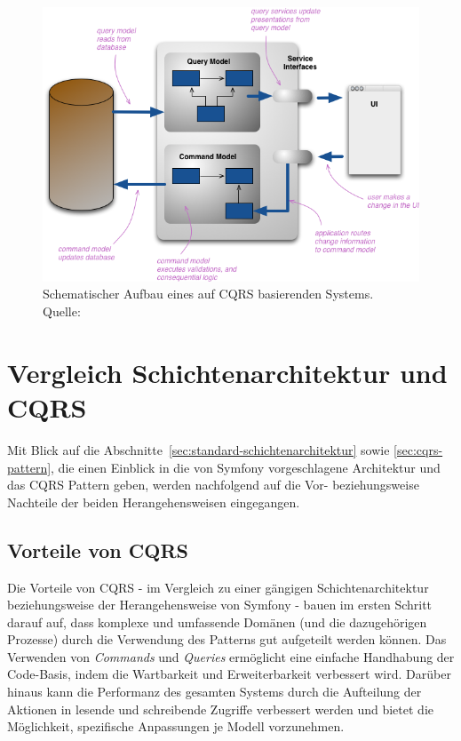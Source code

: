 \documentclass[a4paper,12pt,twoside]{scrreprt}
\begin{document}
\begin{figure}[ht]
    \centering
    \includegraphics[scale=0.6]{images/cqrs_fowler.png}
    \caption[Schematischer Aufbau eines auf CQRS basierenden Systems]{Schematischer Aufbau eines auf CQRS basierenden Systems.\\Quelle: \cite{fowler_cqrs_2011}}
    \label{fig:cqrs-fowler}
\end{figure}

\section{Vergleich Schichtenarchitektur und CQRS}
\label{sec:vergleich-schichten-cqrs}
Mit Blick auf die Abschnitte~\ref{sec:standard-schichtenarchitektur} sowie \ref{sec:cqrs-pattern}, die einen Einblick in die von Symfony vorgeschlagene Architektur und das CQRS Pattern geben, werden nachfolgend auf die Vor- beziehungsweise Nachteile der beiden Herangehensweisen eingegangen.

\subsection{Vorteile von CQRS}
\label{sub-sec:cqrs-vorteile}
Die Vorteile von CQRS - im Vergleich zu einer gängigen Schichtenarchitektur beziehungsweise der Herangehensweise von Symfony - bauen im ersten Schritt darauf auf, dass komplexe und umfassende Domänen (und die dazugehörigen Prozesse) durch die Verwendung des Patterns gut aufgeteilt werden können. Das Verwenden von \textit{Commands} und \textit{Queries} ermöglicht eine einfache Handhabung der Code-Basis, indem die Wartbarkeit und Erweiterbarkeit verbessert wird. Darüber hinaus kann die Performanz des gesamten Systems durch die Aufteilung der Aktionen in lesende und schreibende Zugriffe verbessert werden und bietet die Möglichkeit, spezifische Anpassungen je Modell vorzunehmen. \parencite[][Seite 240]{ingeno_software_2018}
\end{document}
